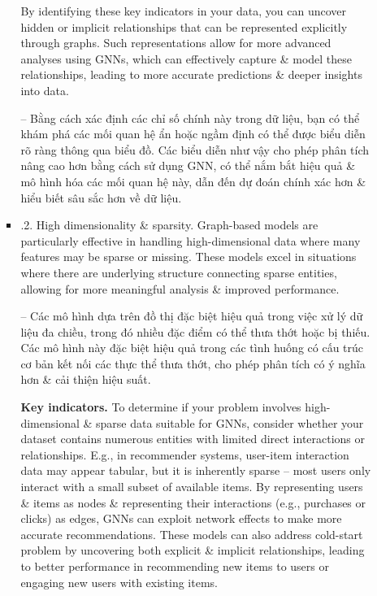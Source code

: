\documentclass{article}
\begin{document}
\begin{itemize}
\begin{itemize}
\begin{itemize}
            By identifying these key indicators in your data, you can uncover hidden or implicit relationships that can be represented explicitly through graphs. Such representations allow for more advanced analyses using GNNs, which can effectively capture \& model these relationships, leading to more accurate predictions \& deeper insights into data.

            -- Bằng cách xác định các chỉ số chính này trong dữ liệu, bạn có thể khám phá các mối quan hệ ẩn hoặc ngầm định có thể được biểu diễn rõ ràng thông qua biểu đồ. Các biểu diễn như vậy cho phép phân tích nâng cao hơn bằng cách sử dụng GNN, có thể nắm bắt hiệu quả \& mô hình hóa các mối quan hệ này, dẫn đến dự đoán chính xác hơn \& hiểu biết sâu sắc hơn về dữ liệu.
            \item {.2. High dimensionality \& sparsity.} Graph-based models are particularly effective in handling high-dimensional data where many features may be sparse or missing. These models excel in situations where there are underlying structure connecting sparse entities, allowing for more meaningful analysis \& improved performance.

            -- Các mô hình dựa trên đồ thị đặc biệt hiệu quả trong việc xử lý dữ liệu đa chiều, trong đó nhiều đặc điểm có thể thưa thớt hoặc bị thiếu. Các mô hình này đặc biệt hiệu quả trong các tình huống có cấu trúc cơ bản kết nối các thực thể thưa thớt, cho phép phân tích có ý nghĩa hơn \& cải thiện hiệu suất.

            {\bf Key indicators.} To determine if your problem involves high-dimensional \& sparse data suitable for GNNs, consider whether your dataset contains numerous entities with limited direct interactions or relationships. E.g., in recommender systems, user-item interaction data may appear tabular, but it is inherently sparse -- most users only interact with a small subset of available items. By representing users \& items as nodes \& representing their interactions (e.g., purchases or clicks) as edges, GNNs can exploit network effects to make more accurate recommendations. These models can also address cold-start problem by uncovering both explicit \& implicit relationships, leading to better performance in recommending new items to users or engaging new users with existing items.


\end{itemize}
\end{itemize}
\end{itemize}
\end{document}
